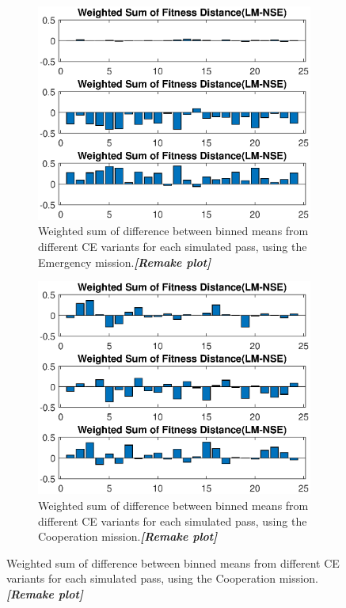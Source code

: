 \begin{figure}[ht!]
\begin{subfigure}{0.55\linewidth}
	\centering
	\includegraphics[scale=0.6]{figures/c_sim_results/emer_weighted_sumFitness.eps}
	\caption{Weighted sum of difference between binned means from different CE variants for each simulated pass, using the Emergency mission.\textbf{\textit{[Remake plot]}}}
	\label{fig:cSimWeightEmer}
\end{subfigure}%
\begin{subfigure}{0.55\linewidth}
	\centering
	\includegraphics[scale=0.6]{figures/c_sim_results/coop_weighted_sumFitness.eps}
	\caption{Weighted sum of difference between binned means from different CE variants for each simulated pass, using the Cooperation mission.\textbf{\textit{[Remake plot]}}}

\end{subfigure}
\end{figure}
